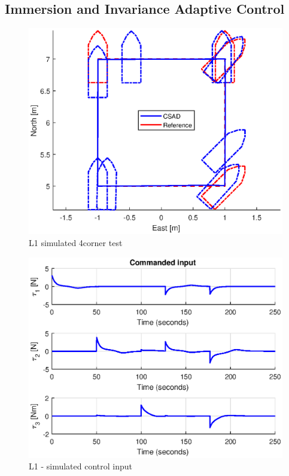 \subsection{Immersion and Invariance Adaptive Control}
\begin{figure}[!h]
\centering
\includegraphics[width=1\textwidth]{plots/L1pose_sim.eps}
\caption{L1 simulated 4corner test}
\label{fig:sime4c}
\end{figure}

\begin{figure}[!h]
\centering
\includegraphics[width=1\textwidth]{plots/L1tau_sim.eps}
\caption{L1  - simulated control input}
\label{fig:simtau}
\end{figure}

